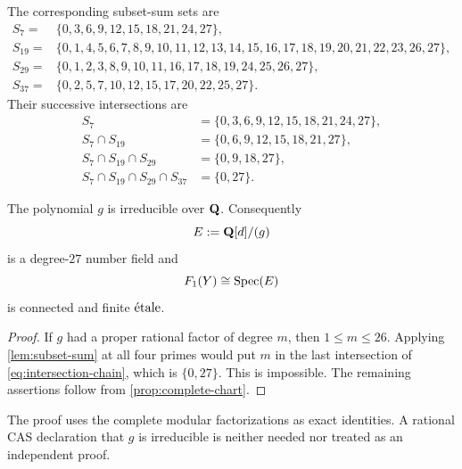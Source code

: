 The corresponding subset-sum sets are
\begin{align}
S_7={}&\{0,3,6,9,12,15,18,21,24,27\},\nonumber\\
S_{19}={}&\{0,1,4,5,6,7,8,9,10,11,12,13,14,15,16,17,
18,19,20,21,22,23,26,27\},\nonumber\\
S_{29}={}&\{0,1,2,3,8,9,10,11,16,17,18,19,24,25,26,27\},\nonumber\\
S_{37}={}&\{0,2,5,7,10,12,15,17,20,22,25,27\}.
\label{eq:subset-sets}
\end{align}
Their successive intersections are
\begin{equation}
\begin{aligned}
S_7&=\{0,3,6,9,12,15,18,21,24,27\},\\
S_7\cap S_{19}&=\{0,6,9,12,15,18,21,27\},\\
S_7\cap S_{19}\cap S_{29}&=\{0,9,18,27\},\\
S_7\cap S_{19}\cap S_{29}\cap S_{37}&=\{0,27\}.
\end{aligned}
\label{eq:intersection-chain}
\end{equation}

\begin{proposition}
\label{prop:g-irreducible}
The polynomial \(g\) is irreducible over \(\mathbf Q\).  Consequently
\[
 E:=\mathbf Q[d]/(g)
\]
is a degree-\(27\) number field and
\[
 F_1(Y)\cong\operatorname{Spec}(E)
\]
is connected and finite \(\mathrm{\acute{e}tale}\).
\end{proposition}

\begin{proof}
If \(g\) had a proper rational factor of degree \(m\), then
\(1\le m\le26\).  Applying \cref{lem:subset-sum} at all four primes would
put \(m\) in the last intersection of
\cref{eq:intersection-chain}, which is \(\{0,27\}\).  This is impossible.
The remaining assertions follow from \cref{prop:complete-chart}.
\end{proof}

\begin{remark}
The proof uses the complete modular factorizations as exact identities.
A rational CAS declaration that \(g\) is irreducible is neither needed nor
treated as an independent proof.
\end{remark}
